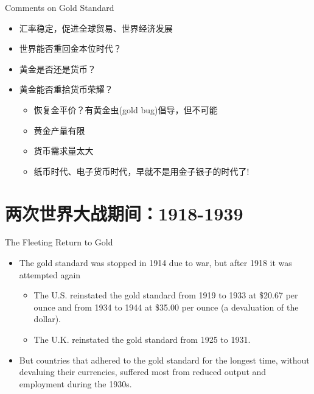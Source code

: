 \documentclass[10pt,hyperref={CJKbookmarks=true},xcolor=dvipsnames,aspectratio=169]{beamer}
\begin{document}
\begin{frame}{Comments on Gold Standard}
		\begin{itemize}[<+->]
	\item 汇率稳定，促进全球贸易、世界经济发展
	\item 世界能否重回金本位时代？
	\item 黄金是否还是货币？
	\item 黄金能否重拾货币荣耀？
		\begin{itemize}
			\item 恢复金平价？有黄金虫(gold bug)倡导，但不可能
			\item 黄金产量有限
			\item 货币需求量太大
			\item 纸币时代、电子货币时代，早就不是用金子银子的时代了!
		\end{itemize}
\end{itemize}
\end{frame}

\section{两次世界大战期间：1918-1939}
\begin{frame}{The Fleeting Return to Gold}
		\begin{itemize}
	\item The gold standard was stopped in 1914 due to war,
	but after 1918 it was attempted again
		\begin{itemize}
		\item The U.S. reinstated the gold standard from 1919 to 1933
		at \$20.67 per ounce and from 1934 to 1944 at \$35.00 per
		ounce (a devaluation of the dollar).
		\item The U.K. reinstated the gold standard from 1925 to 1931.
	\end{itemize}
	\item But countries that adhered to the gold standard for
	the longest time, without devaluing their
	currencies, suffered most from reduced output and
	employment during the 1930s.
	

\end{itemize}
\end{frame}
\end{document}
